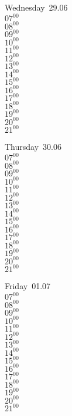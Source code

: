 \documentclass[11pt,a4paper]{book}\usepackage[]{graphicx}\usepackage[]{color}
\begin{document}
\begin{weekdaybox}
  Wednesday~29.06\\
  { 
  \vfill
  $07^{00}$\\
$08^{00}$\\
$09^{00}$\\
$10^{00}$\\
$11^{00}$\\
$12^{00}$\\
$13^{00}$\\
$14^{00}$\\
$15^{00}$\\
$16^{00}$\\
$17^{00}$\\
$18^{00}$\\
$19^{00}$\\
$20^{00}$\\
$21^{00}$\\
  }
\end{weekdaybox}
\clearpage
\begin{headerbox}
\end{headerbox}
\begin{weekdaybox}
  Thursday~30.06\\
  { 
  \vfill
  $07^{00}$\\
$08^{00}$\\
$09^{00}$\\
$10^{00}$\\
$11^{00}$\\
$12^{00}$\\
$13^{00}$\\
$14^{00}$\\
$15^{00}$\\
$16^{00}$\\
$17^{00}$\\
$18^{00}$\\
$19^{00}$\\
$20^{00}$\\
$21^{00}$\\
  }
\end{weekdaybox} 
\begin{weekdaybox}
  Friday~01.07\\
  { 
  \vfill
  $07^{00}$\\
$08^{00}$\\
$09^{00}$\\
$10^{00}$\\
$11^{00}$\\
$12^{00}$\\
$13^{00}$\\
$14^{00}$\\
$15^{00}$\\
$16^{00}$\\
$17^{00}$\\
$18^{00}$\\
$19^{00}$\\
$20^{00}$\\
$21^{00}$\\
  }
\end{weekdaybox}
\end{document}
